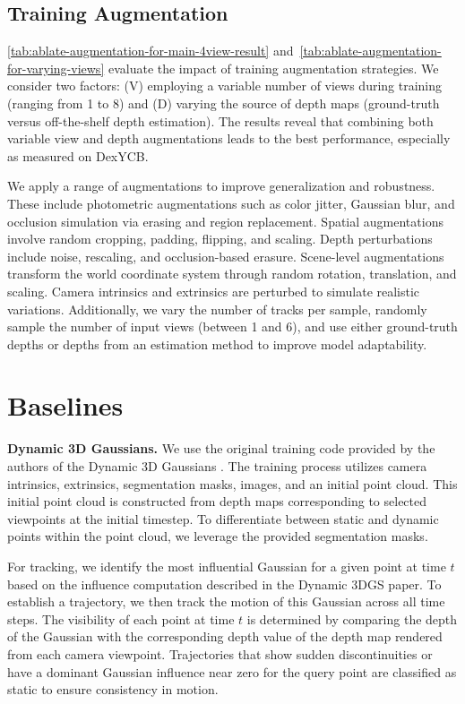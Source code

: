 \subsection{Training Augmentation} \label{app:sec:trainingdetails}


\cref{tab:ablate-augmentation-for-main-4view-result} and~\ref{tab:ablate-augmentation-for-varying-views} evaluate the impact of training augmentation strategies. We consider two factors: (V) employing a variable number of views during training (ranging from 1 to 8) and (D) varying the source of depth maps (ground-truth versus off-the-shelf depth estimation). The results reveal that combining both variable view and depth augmentations leads to the best performance, especially as measured on DexYCB.

We apply a range of augmentations to improve generalization and robustness. These include photometric augmentations such as color jitter, Gaussian blur, and occlusion simulation via erasing and region replacement. Spatial augmentations involve random cropping, padding, flipping, and scaling. Depth perturbations include noise, rescaling, and occlusion-based erasure. Scene-level augmentations transform the world coordinate system through random rotation, translation, and scaling. Camera intrinsics and extrinsics are perturbed to simulate realistic variations. Additionally, we vary the number of tracks per sample, randomly sample the number of input views (between 1 and 6), and use either ground-truth depths or depths from an estimation method to improve model adaptability. 

\section{Baselines}
\label{app:sec:baseline_implementation}
\textbf{Dynamic 3D Gaussians.} We use the original training code provided by the authors of the Dynamic 3D Gaussians \cite{luiten2023dynamic}. The training process utilizes camera intrinsics, extrinsics, segmentation masks, images, and an initial point cloud. This initial point cloud is constructed from depth maps corresponding to selected viewpoints at the initial timestep. To differentiate between static and dynamic points within the point cloud, we leverage the provided segmentation masks.

For tracking, we identify the most influential Gaussian for a given point at time $t$ based on the influence computation described in the Dynamic 3DGS paper. To establish a trajectory, we then track the motion of this Gaussian across all time steps. The visibility of each point at time $t$ is determined by comparing the depth of the Gaussian with the corresponding depth value of the depth map rendered from each camera viewpoint. Trajectories that show sudden discontinuities or have a dominant Gaussian influence near zero for the query point are classified as static to ensure consistency in motion.

